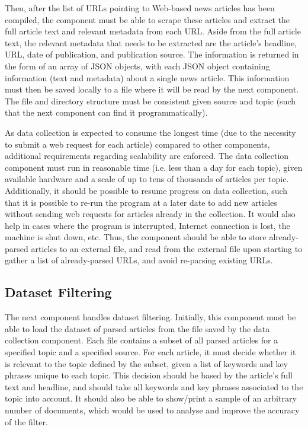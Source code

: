 \documentclass{report}
\begin{document}
Then, after the list of URLs pointing to Web-based news articles has been compiled, the component must be able to scrape these articles and extract the full article text and relevant metadata from each URL.
Aside from the full article text, the relevant metadata that needs to be extracted are the article's headline, URL, date of publication, and publication source.
The information is returned in the form of an array of JSON objects, with each JSON object containing information (text and metadata) about a single news article.
This information must then be saved locally to a file where it will be read by the next component. The file and directory structure must be consistent given source and topic (such that the next component can find it programmatically).

As data collection is expected to consume the longest time (due to the necessity to submit a web request for each article) compared to other components, additional requirements regarding scalability are enforced.
The data collection component must run in reasonable time (i.e. less than a day for each topic), given available hardware and a scale of up to tens of thousands of articles per topic.
Additionally, it should be possible to resume progress on data collection, such that it is possible to re-run the program at a later date to add new articles without sending web requests for articles already in the collection.
It would also help in cases where the program is interrupted, Internet connection is lost, the machine is shut down, etc.
Thus, the component should be able to store already-parsed articles to an external file, and read from the external file upon starting to gather a list of already-parsed URLs, and avoid re-parsing existing URLs.

\subsection{Dataset Filtering}

The next component handles dataset filtering.
Initially, this component must be able to load the dataset of parsed articles from the file saved by the data collection component.
Each file contains a subset of all parsed articles for a specified topic and a specified source.
For each article, it must decide whether it is relevant to the topic defined by the subset, given a list of keywords and key phrases unique to each topic.
This decision should be based by the article's full text and headline, and should take all keywords and key phrases associated to the topic into account.
It should also be able to show/print a sample of an arbitrary number of documents, which would be used to analyse and improve the accuracy of the filter.
\end{document}
